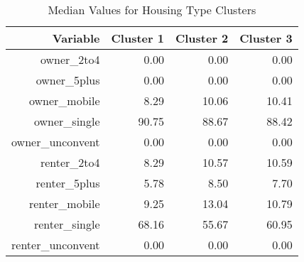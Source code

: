 \begin{table}[ht]
    \centering
    \caption{Median Values for Housing Type Clusters}
    \label{tab:hh_type}
    \begin{tabular}{|r|r|r|r|}
      \hline
     Variable & Cluster 1 & Cluster 2 & Cluster 3 \\ 
      \hline
    owner\_2to4 & 0.00 & 0.00 & 0.00 \\ 
    \hline
      owner\_5plus & 0.00 & 0.00 & 0.00 \\ 
      \hline
      owner\_mobile & 8.29 & 10.06 & 10.41 \\ 
      \hline
      owner\_single & 90.75 & 88.67 & 88.42 \\ 
      \hline
      owner\_unconvent & 0.00 & 0.00 & 0.00 \\
      \hline 
      renter\_2to4 & 8.29 & 10.57 & 10.59 \\ 
      \hline
      renter\_5plus & 5.78 & 8.50 & 7.70 \\ 
      \hline
      renter\_mobile & 9.25 & 13.04 & 10.79 \\ 
      \hline
      renter\_single & 68.16 & 55.67 & 60.95 \\ 
      \hline
      renter\_unconvent & 0.00 & 0.00 & 0.00 \\ 
       \hline
    \end{tabular}
    \end{table}